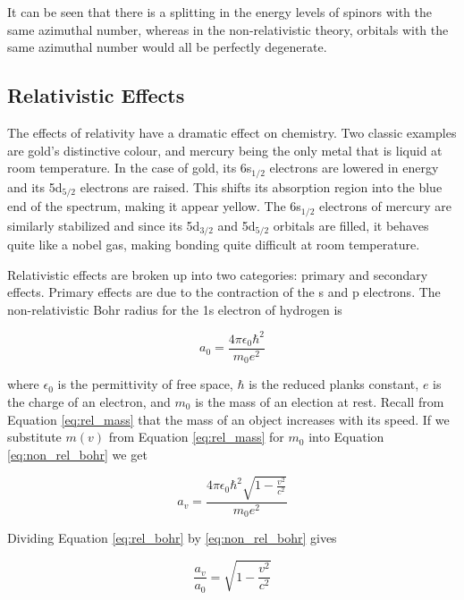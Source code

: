 It can be seen that there is a splitting in the energy levels of spinors with the same azimuthal number, whereas in the non-relativistic theory, orbitals with the same azimuthal number would all be perfectly degenerate.

\subsection{Relativistic Effects}
The effects of relativity have a dramatic effect on chemistry. Two classic examples are gold's distinctive colour, and mercury being the only metal that is liquid at room temperature. In the case of gold, its 6s$_{1/2}$ electrons are lowered in energy and its 5d$_{5/2}$ electrons are raised. This shifts its absorption region into the blue end of the spectrum, making it appear yellow\cite{Bartlett1998}. The 6s$_{1/2}$ electrons of mercury are similarly stabilized and since its 5d$_{3/2}$ and 5d$_{5/2}$ orbitals are filled, it behaves quite like a nobel gas, making bonding quite difficult at room temperature\cite{Norrby1991}.

Relativistic effects are broken up into two categories: primary and secondary effects. Primary effects are due to the contraction of the s and p electrons. The non-relativistic Bohr radius for the 1s electron of hydrogen is\cite{Griffiths2} 

\begin{equation}
\label{eq:non_rel_bohr}
a_{0} = \frac{4\pi{}\epsilon_{0}\hbar^{2}}{m_{0}e^{2}}
\end{equation}

where $\epsilon_{0}$ is the permittivity of free space, $\hbar$ is the reduced planks constant, $e$ is the charge of an electron, and $m_{0}$ is the mass of an election at rest. Recall from Equation \ref{eq:rel_mass} that the mass of an object increases with its speed. If we substitute $m(v)$ from Equation \ref{eq:rel_mass} for $m_{0}$ into Equation \ref{eq:non_rel_bohr} we get

\begin{equation}
\label{eq:rel_bohr}
a_{v} = \frac{4\pi{}\epsilon_{0}\hbar^{2}\sqrt{1 - \frac{v^2}{c^2}}}{m_{0}e^{2}}
\end{equation}

Dividing Equation \ref{eq:rel_bohr} by \ref{eq:non_rel_bohr} gives 

\begin{equation}
\label{eq:bohr_frac}
\frac{a_{v}}{a_{0}} = \sqrt{1 - \frac{v^2}{c^2}}
\end{equation}

